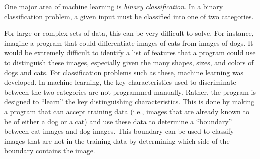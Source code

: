 \documentclass[%
 reprint,
nofootinbib,
 amsmath,amssymb,
 aps,
]{revtex4-2}
\begin{document}
One major area of machine learning is \textit{binary classification}. In a binary classification problem, a given input must be classified into one of two categories.

For large or complex sets of data, this can be very difficult to solve. 
For instance, imagine a program that could differentiate images of cats from images of dogs. It would be extremely difficult to identify a list of features that a program could use to distinguish these images, especially given the many shapes, sizes, and colors of dogs and cats.
For classification problems such as these, machine learning was developed. 
In machine learning, the key characteristics used to discriminate between the two categories are not programmed manually. Rather, the program is designed to ``learn'' the key distinguishing characteristics. This is done by making a program that can accept training data (i.e., images that are already known to be of either a dog or a cat) and use these data to determine a ``boundary'' between cat images and dog images. This boundary can be used to classify images that are not in the training data by determining which side of the boundary contains the image.
\end{document}
